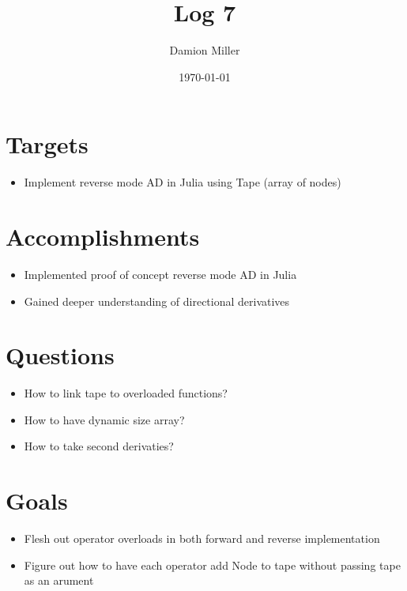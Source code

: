 \documentclass[12pt, letterpaper]{article}
\title{Log 7}
\author{Damion Miller}
\date{\today}
\begin{document}
\maketitle
\section*{Targets}
\begin{itemize}
\item Implement reverse mode AD in Julia using Tape (array of nodes)
\end{itemize}

\section*{Accomplishments}
\begin{itemize}
\item Implemented proof of concept reverse mode AD in Julia
\item Gained deeper understanding of directional derivatives
\end{itemize}

\section*{Questions}
\begin{itemize}
\item How to link tape to overloaded functions?
\item How to have dynamic size array?
\item How to take second derivaties?
\end{itemize}

\section*{Goals}
\begin{itemize}
\item Flesh out operator overloads in both forward and reverse implementation
\item Figure out how to have each operator add Node to tape without passing tape as an arument
\end{itemize}
\end{document}
